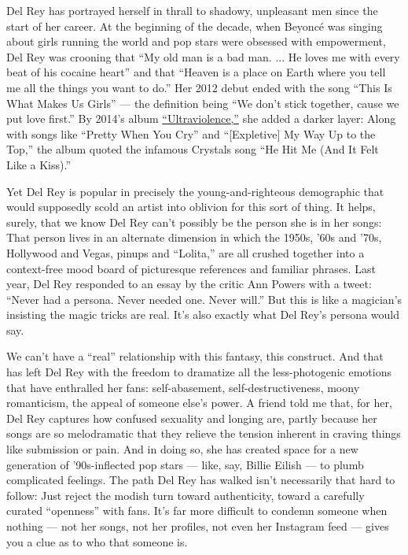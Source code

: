 Del Rey has portrayed herself in thrall to shadowy, unpleasant men since
the start of her career. At the beginning of the decade, when Beyoncé
was singing about girls running the world and pop stars were obsessed
with empowerment, Del Rey was crooning that ``My old man is a bad man.
... He loves me with every beat of his cocaine heart'' and that ``Heaven
is a place on Earth where you tell me all the things you want to do.''
Her 2012 debut ended with the song ``This Is What Makes Us Girls'' ---
the definition being ``We don't stick together, cause we put love
first.'' By 2014's album
\href{https://www.nytimes3xbfgragh.onion/2014/06/15/arts/music/lana-del-rey-still-stirs-things-up-with-ultraviolence.html}{``Ultraviolence,''}
she added a darker layer: Along with songs like ``Pretty When You Cry''
and ``{[}Expletive{]} My Way Up to the Top,'' the album quoted the
infamous Crystals song ``He Hit Me (And It Felt Like a Kiss).''

Yet Del Rey is popular in precisely the young-and-righteous demographic
that would supposedly scold an artist into oblivion for this sort of
thing. It helps, surely, that we know Del Rey can't possibly be the
person she is in her songs: That person lives in an alternate dimension
in which the 1950s, '60s and '70s, Hollywood and Vegas, pinups and
``Lolita,'' are all crushed together into a context-free mood board of
picturesque references and familiar phrases. Last year, Del Rey
responded to an essay by the critic Ann Powers with a tweet: ``Never had
a persona. Never needed one. Never will.'' But this is like a magician's
insisting the magic tricks are real. It's also exactly what Del Rey's
persona would say.

We can't have a ``real'' relationship with this fantasy, this construct.
And that has left Del Rey with the freedom to dramatize all the
less-photogenic emotions that have enthralled her fans: self-abasement,
self-destructiveness, moony romanticism, the appeal of someone else's
power. A friend told me that, for her, Del Rey captures how confused
sexuality and longing are, partly because her songs are so melodramatic
that they relieve the tension inherent in craving things like submission
or pain. And in doing so, she has created space for a new generation of
'90s-inflected pop stars --- like, say, Billie Eilish --- to plumb
complicated feelings. The path Del Rey has walked isn't necessarily that
hard to follow: Just reject the modish turn toward authenticity, toward
a carefully curated ``openness'' with fans. It's far more difficult to
condemn someone when nothing --- not her songs, not her profiles, not
even her Instagram feed --- gives you a clue as to who that someone is.

